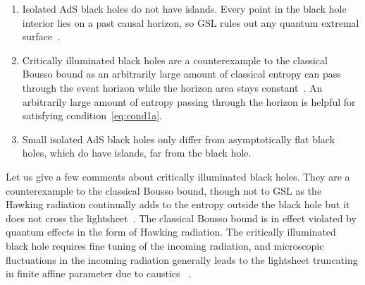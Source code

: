 \documentclass[a4paper,11pt]{article}
\newcommand{\cts}[1]{\ignorespaces}
\newcommand{\del}{\partial}
\begin{document}
\begin{enumerate}
\item Isolated AdS black holes do not have islands. Every point in the black hole interior lies on a past causal horizon, so GSL rules out any quantum extremal surface~\cite{Jacobson2003, Engelhardt2021}.
\item Critically illuminated black holes are a counterexample to the classical Bousso bound as an arbitrarily large amount of classical entropy can pass through the event horizon while the horizon area stays constant~\cite{Lowe1999}. An arbitrarily large amount of entropy passing through the horizon is helpful for satisfying condition~\eqref{eq:cond1a}.
\item Small isolated AdS black holes only differ from asymptotically flat black holes, which do have islands, far from the black hole.
\end{enumerate}

Let us give a few comments about critically illuminated black holes. They are a counterexample to the classical Bousso bound, though not to GSL as the Hawking radiation continually adds to the entropy outside the black hole but it does not cross the lightsheet~\cite{Lowe1999}. The classical Bousso bound is in effect violated by quantum effects in the form of Hawking radiation. The critically illuminated black hole requires fine tuning of the incoming radiation, and microscopic fluctuations in the incoming radiation generally leads to the lightsheet truncating in finite affine parameter due to caustics
~\cite{Flanagan2000, Bousso2000, Bousso2002}. 
\end{document}
